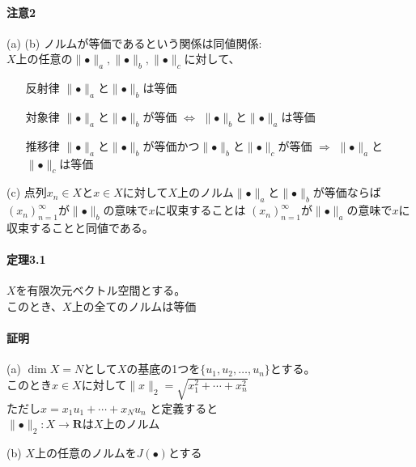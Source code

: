 \documentclass[12pt,a4paper]{article}
\begin{document}
      \paragraph{注意2}
        (a) (b) ノルムが等価であるという関係は同値関係: \\
        $X$上の任意の$\parallel\bullet\parallel_a, \parallel\bullet\parallel_b, \parallel\bullet\parallel_c$に対して、
        \begin{itemize}
          \item[反射律] $\parallel\bullet\parallel_a$と$\parallel\bullet\parallel_b$は等価
          \item[対象律] $\parallel\bullet\parallel_a$と$\parallel\bullet\parallel_b$が等価 $\Leftrightarrow$ $\parallel\bullet\parallel_b$と$\parallel\bullet\parallel_a$は等価
          \item[推移律] $\parallel\bullet\parallel_a$と$\parallel\bullet\parallel_b$が等価かつ$\parallel\bullet\parallel_b$と$\parallel\bullet\parallel_c$が等価 $\Rightarrow$ $\parallel\bullet\parallel_a$と$\parallel\bullet\parallel_c$は等価
        \end{itemize}
        (c) 点列$x_n \in X$と$x \in X$に対して$X$上のノルム$\parallel\bullet\parallel_a$と$\parallel\bullet\parallel_b$が等価ならば\\
        ${(x_n)}_{n=1}^\infty$が$\parallel\bullet\parallel_b$の意味で$x$に収束することは
        ${(x_n)}_{n=1}^\infty$が$\parallel\bullet\parallel_a$の意味で$x$に収束することと同値である。
      \paragraph{定理3.1}
        $X$を有限次元ベクトル空間とする。\\
        このとき、$X$上の全てのノルムは等価
      \paragraph{証明}
      (a) $\dim X = N$として$X$の基底の1つを$\lbrace u_1, u_2, \ldots, u_n \rbrace$とする。\\
        このとき$x \in X$に対して$\parallel x \parallel_2 = \sqrt{x_1^2 + \cdots + x_n^2}$\\
        ただし$x = x_1 u_1 + \cdots + x_N u_n$
        と定義すると\\
        $\parallel \bullet \parallel_2 : X \rightarrow \mathbf{R}$は$X$上のノルム

      (b) $X$上の任意のノルムを$J(\bullet)$とする
\end{document}
